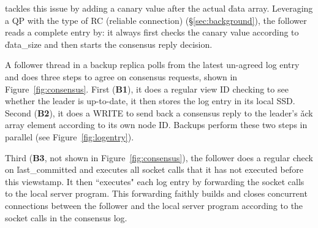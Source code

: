 \xxx tackles this issue by adding a canary value after the actual \v{data} 
array. Leveraging a QP with the type of RC (reliable connection) 
(\S\ref{sec:background}), the follower reads a complete entry by: it
always first checks the canary value according to \v{data\_size} and then 
starts the consensus reply decision.
% 

A follower thread in a backup replica polls from the latest un-agreed log 
entry and does three steps to agree on consensus requests, shown in 
Figure~\ref{fig:consensus}. First (\textbf{B1}), it does a regular \paxos view 
ID checking to see whether the leader is up-to-date, it then stores the log 
entry in its local SSD. Second (\textbf{B2}), it does a WRITE to send back 
a consensus reply to the leader's \v{ack} array element according to its 
own node ID. Backups perform these two steps in parallel 
(see Figure~\ref{fig:logentry}).

Third (\textbf{B3}, not shown in Figure~\ref{fig:consensus}), the follower 
does a regular \paxos check on \v{last\_committed} and executes all socket 
calls that it has not executed before this viewstamp. It then ``executes" each 
log entry by forwarding the socket calls to the local server program. This 
forwarding faithly builds and closes concurrent connections between the follower 
and the local server program according to the socket calls in the consensus log.


